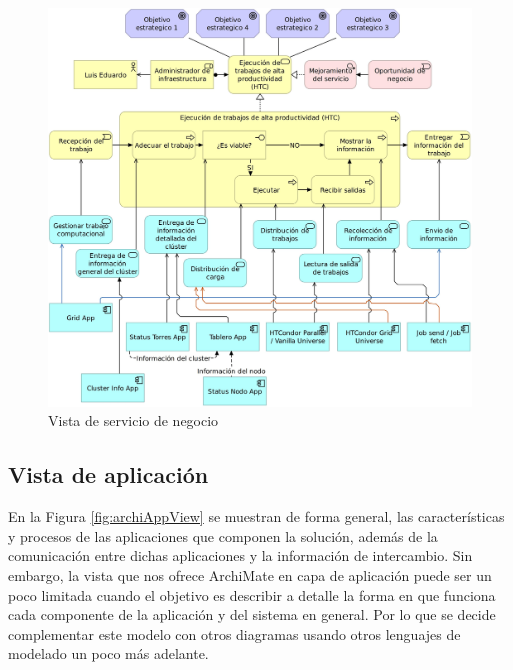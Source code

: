 \begin{figure}[H]
	\centering
	\includegraphics[scale=0.13]{tablas-images/archi/Business Service View.jpg}
	\caption{Vista de servicio de negocio}
    \label{fig:archiBSView}
\end{figure}

\subsection{Vista de aplicación}
\noindent
En la Figura \ref{fig:archiAppView} se muestran de forma general, las características y procesos de las aplicaciones que componen la solución, además de la comunicación entre dichas aplicaciones y la información de intercambio. Sin embargo, la vista que nos ofrece ArchiMate en capa de aplicación puede ser un poco limitada cuando el objetivo es describir a detalle la forma en que funciona cada componente de la aplicación y del sistema en general. Por lo que se decide complementar este modelo con otros diagramas usando otros lenguajes de modelado un poco más adelante.

